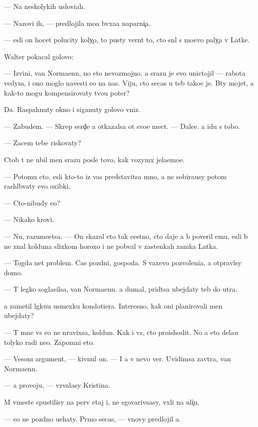 \documentclass[10pt]{book}
\begin{document}
— Na neskolykih uslovi{\y}ah.

— Nazovi ih, — predlojila mo{\y}a b{\yi}vxa{\y}a naparni{\c}a.

— {\Y}esli on hocet polucity koly{\c}o, to pusty vern{\e}t to, cto sn{\ia}l s mo{\y}evo paly{\c}a v Latke.

Walter pokacal go\-lo\-vo{\y}:

— Izvini, van Normaenn, no eto nevozmojno. {\Y}a srazu je {\y}evo unictojil — rabota vedym{\yi}, i ono moglo navesti {\y}e{\y}o na nas. Viju, cto se{\y}cas u teb{\ia} tako{\y}e je. B{\yi}ty mojet, {\y}a kak-to mogu kompensirovaty tvo{\y}u poter{\io}?

Da. Raspahnuty okno i siganuty go\-lo\-vo{\y} vniz.

— Zabudem. — Skrep{\ia} serd{\c}e {\y}a otkazalsa ot svo{\y}e{\y} mect{\yi}. — Dale{\y}e. {\Y}a idu s tobo{\y}.

— Zacem tebe riskovaty?

Ctob{\yi} t{\yi} ne ubil men{\ia} srazu posle tovo, kak vozym{\e}x jela{\y}emo{\y}e.

— Potomu cto, {\y}esli kto-to iz vas predstavitsa mno{\y}, {\y}a ne sobira{\y}usy potom ras\-hl{\e}\-b{\yi}\-vaty {\y}evo oxibki.

— Cto-nibudy {\y}e{\x}o?

— Nikako{\y} krovi.

— Nu, razume{\y}etsa. — On skazal eto tak cestno, cto daje {\y}a b{\yi} poveril {\y}emu, {\y}esli b{\yi} ne znal kolduna slixkom horoxo i ne pob{\yi}val v zastenkah zamka Latka.

— Togda net problem. Cas pozdni{\y}, gospoda. S vaxevo pozvoleni{\y}a, {\y}a otpravl{\io}sy domo{\y}.

— T{\yi} legko soglasilsa, van Normaenn. {\Y}a dumal, prid{\e}tsa ubejdaty teb{\ia} do utra.

{\Y}a zametil l{\e}gku{\y}u usmexku kondotiera. Interesno, kak oni planirovali men{\ia} ubejdaty?

— T{\yi} mne vs{\e} {\y}e{\x}o ne nravixsa, koldun. Kak i vs{\e}, cto proishodit. No {\y}a eto dela{\y}u tolyko radi ne{\y}o. Zapomni eto.

— Vesom{\yi}{\y} argument, — kivnul on. — I {\y}a v nevo ver{\io}. Uvidimsa zavtra, van Normaenn.

— {\Y}a provoju, — v{\yi}zvalasy Kristina.

M{\yi} vmeste spustilisy na perv{\yi}{\y} etaj i, ne sgovariva{\y}asy, v{\yi}xli na uli{\c}u.

— {\Y}e{\x}o ne pozdno u{\y}ehaty. Pr{\ia}mo se{\y}cas, — vnovy predlojil {\y}a.
\end{document}
